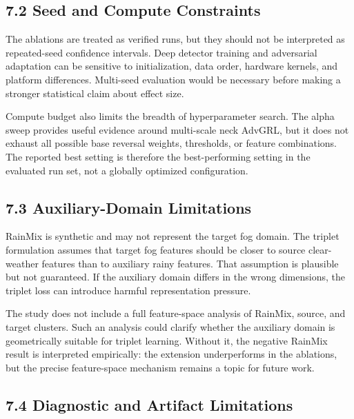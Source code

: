 \documentclass[
  11pt,
]{article}
\begin{document}
\hypertarget{seed-and-compute-constraints}{%
\subsection{7.2 Seed and Compute
Constraints}\label{seed-and-compute-constraints}}

The ablations are treated as verified runs, but they should not be
interpreted as repeated-seed confidence intervals. Deep detector
training and adversarial adaptation can be sensitive to initialization,
data order, hardware kernels, and platform differences. Multi-seed
evaluation would be necessary before making a stronger statistical claim
about effect size.

Compute budget also limits the breadth of hyperparameter search. The
alpha sweep provides useful evidence around multi-scale neck AdvGRL, but
it does not exhaust all possible base reversal weights, thresholds, or
feature combinations. The reported best setting is therefore the
best-performing setting in the evaluated run set, not a globally
optimized configuration.

\hypertarget{auxiliary-domain-limitations}{%
\subsection{7.3 Auxiliary-Domain
Limitations}\label{auxiliary-domain-limitations}}

RainMix is synthetic and may not represent the target fog domain. The
triplet formulation assumes that target fog features should be closer to
source clear-weather features than to auxiliary rainy features. That
assumption is plausible but not guaranteed. If the auxiliary domain
differs in the wrong dimensions, the triplet loss can introduce harmful
representation pressure.

The study does not include a full feature-space analysis of RainMix,
source, and target clusters. Such an analysis could clarify whether the
auxiliary domain is geometrically suitable for triplet learning. Without
it, the negative RainMix result is interpreted empirically: the
extension underperforms in the ablations, but the precise feature-space
mechanism remains a topic for future work.

\hypertarget{diagnostic-and-artifact-limitations}{%
\subsection{7.4 Diagnostic and Artifact
Limitations}\label{diagnostic-and-artifact-limitations}}
\end{document}
